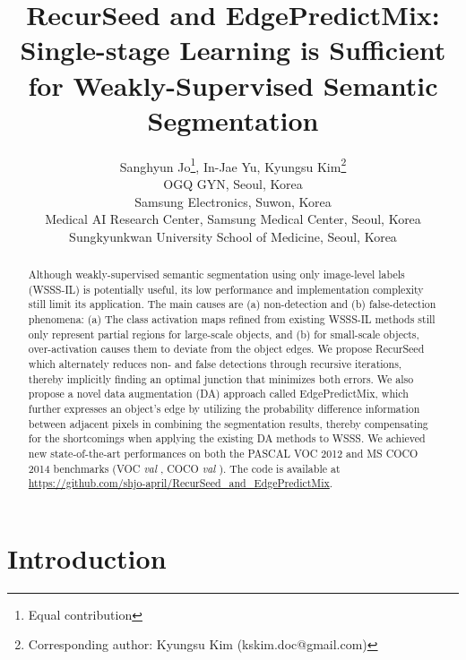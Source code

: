\documentclass[11pt]{article}
\begin{document}
\title{RecurSeed and EdgePredictMix: Single-stage Learning is Sufficient for Weakly-Supervised Semantic Segmentation}
	\date{}
	\author{
		Sanghyun Jo\thanks{Equal contribution}, In-Jae Yu\footnotemark[1], Kyungsu Kim\thanks{Corresponding author: Kyungsu Kim (kskim.doc@gmail.com)}\\ 
		{\small OGQ GYN, Seoul, Korea}\\
		{\small Samsung Electronics, Suwon, Korea}\\
		{\small Medical AI Research Center, Samsung Medical Center, Seoul, Korea}\\
		{\small Sungkyunkwan University School of Medicine, Seoul, Korea}
} 
	 
	
	\maketitle 
	
\begin{abstract}
	Although weakly-supervised semantic segmentation using only image-level labels (WSSS-IL) is potentially useful, its low performance and implementation complexity still limit its application. The main causes are (a) non-detection and (b) false-detection phenomena: (a) The class activation maps refined from existing WSSS-IL methods still only represent partial regions for large-scale objects, and (b) for small-scale objects, over-activation causes them to deviate from the object edges. We propose RecurSeed which alternately reduces non- and false detections through recursive iterations, thereby implicitly finding an optimal junction that minimizes both errors. 
	We also propose a novel data augmentation (DA) approach called EdgePredictMix, which further expresses an object's edge by utilizing the probability difference information between adjacent pixels in combining the segmentation results, thereby compensating for the shortcomings when applying the existing DA methods to WSSS.
	We achieved new state-of-the-art performances on both the PASCAL VOC 2012 and MS COCO 2014 benchmarks (VOC \emph{val} , COCO \emph{val} ). The code is available at \url{https://github.com/shjo-april/RecurSeed_and_EdgePredictMix}.
\end{abstract}
	
\section{Introduction}
\label{section:intro}
\end{document}

